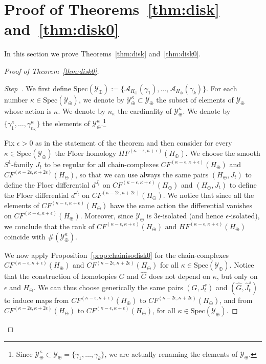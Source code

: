 \documentclass[AHL,Unicode,longabstracts,published]{cedram}
\newcommand{\Spec}{\mathrm{Spec}}
\newcommand{\clY}{\mathcal{Y}}
\newcommand{\clA}{\mathcal{A}}
\newcounter{stepcount}
\newenvironment{step}{\refstepcounter{stepcount}\begin{proof}[Step~\thestepcount]}{\let\qed\relax\end{proof}}
\begin{document}
\section{Proof of Theorems~\ref{thm:disk} and~\ref{thm:disk0}} \label{sec:proofthmdisk}

In this section we prove Theorems~\ref{thm:disk} and~\ref{thm:disk0}.

\begin{proof}[Proof of Theorem~\ref{thm:disk0}]
\begin{step}\label{step1}
We first define $\Spec(\clY_\oplus):= \{ \clA_{H_\oplus}(\gamma_1),\ldots, \clA_{H_\oplus}(\gamma_k)\}$. For each number \linebreak $\kappa \in \Spec(\clY_\oplus)$, we denote by $\clY^\kappa_\oplus \subset \clY_\oplus$ the subset of elements of $\clY_\oplus$ whose action is $\kappa$. We denote by $n_\kappa$ the cardinality of $\clY^\kappa_\oplus $. We denote by $\{\gamma^\kappa_1,\ldots,\gamma^\kappa_{n_\kappa}\}$ the elements of $\clY^\kappa_\oplus $.\footnote{Since $\clY^\kappa_\oplus \subset \clY_\oplus = \{\gamma_1,\ldots,\gamma_k\} $, we are actually renaming the elements of $\clY_\oplus$.}

Fix $\epsilon>0$ as in the statement of the theorem and then consider for every $\kappa \in \Spec(\clY_\oplus)$ the Floer homology $HF^{(\kappa - \epsilon, \kappa+ \epsilon)}(H_\oplus)$. We choose the smooth $S^1$-family $J_t$ to be regular for all chain-complexes $CF^{(\kappa - \epsilon, \kappa+ \epsilon)}(H_\oplus)$ and $CF^{(\kappa - 2\epsilon, \kappa+ 2\epsilon)}(H_\ominus)$, so that we can use always the same pairs $(H_\oplus,J_t)$ to define the Floer differential $d^{J_t}$ on $CF^{(\kappa - \epsilon, \kappa+ \epsilon)}(H_\oplus)$ and $(H_\ominus,J_t)$ to define the Floer differential $d^{J_t}$ on $CF^{(\kappa - 2\epsilon, \kappa+ 2\epsilon)}(H_\ominus)$. We notice that since all the elements of $CF^{(\kappa - \epsilon, \kappa+ \epsilon)}(H_\oplus)$ have the same action the differential vanishes on $CF^{(\kappa - \epsilon, \kappa+ \epsilon)}(H_\oplus)$. Moreover, since $\clY_\oplus$ is $3\epsilon$-isolated (and hence $\epsilon$-isolated), we conclude that the rank of $CF^{(\kappa - \epsilon, \kappa+ \epsilon)}(H_\oplus)$ and $HF^{(\kappa - \epsilon, \kappa+ \epsilon)}(H_\oplus)$ coincide with $\# (\clY^\kappa_\oplus)$.

We now apply Proposition~\ref{prop:chainisodisk0} for the chain-complexes $CF^{(\kappa - \epsilon, \kappa+ \epsilon)}(H_\oplus)$ and \linebreak $CF^{(\kappa - 2\epsilon, \kappa+ 2\epsilon)}(H_\ominus)$ for all $\kappa \in \Spec(\clY_\oplus)$. Notice that the construction of homotopies $G$ and $\widehat{G}$ does not depend on $\kappa$, but only on $\epsilon$ and $H_\ominus$. We can thus choose generically the same pairs $(G,J^s_t)$ and $(\widehat{G},\widehat{J}^s_t)$ to induce maps from $CF^{(\kappa - \epsilon, \kappa+ \epsilon)}(H_\oplus)$ to $CF^{(\kappa - 2\epsilon, \kappa+ 2\epsilon)}(H_\ominus)$, and from $CF^{(\kappa - 2\epsilon, \kappa+ 2\epsilon)}(H_\ominus)$ to $CF^{(\kappa - \epsilon, \kappa+ \epsilon)}(H_\oplus)$, for all $\kappa \in \Spec(\clY_\oplus)$.


\end{step}
\end{proof}
\end{document}

